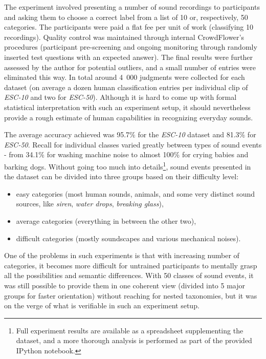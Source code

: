 \documentclass[letterpaper]{sig-alternate}
\begin{document}
The experiment involved presenting a number of sound recordings to participants and asking them to choose a correct label from a list of 10 or, respectively, 50 categories. The participants were paid a flat fee per unit of work (classifying 10 recordings). Quality control was maintained through internal CrowdFlower's procedures (participant pre-screening and ongoing monitoring through randomly inserted test questions with an expected answer). The final results were further assessed by the author for potential outliers, and a small number of entries were eliminated this way. In total around 4~000 judgments were collected for each dataset (on average a dozen human classification entries per individual clip of \textit{ESC-10} and two for \textit{ESC-50}). Although it is hard to come up with formal statistical interpretation with such an experiment setup, it should nevertheless provide a rough estimate of human capabilities in recognizing everyday sounds.

The average accuracy achieved was 95.7\% for the \textit{ESC-10} dataset and 81.3\% for \textit{ESC-50}. Recall for individual classes varied greatly between types of sound events - from 34.1\% for washing machine noise to almost 100\% for crying babies and barking dogs. Without going too much into details\footnote{Full experiment results are available as a spreadsheet supplementing the dataset, and a more thorough analysis is performed as part of the provided IPython notebook.}, sound events presented in the dataset can be divided into three groups based on their difficulty level:

\begin{itemize}[noitemsep,topsep=0pt]
\itemsep0em
\item easy categories (most human sounds, animals, and some very distinct sound sources, like \textit{siren}, \textit{water drops}, \textit{breaking glass}),
\item average categories (everything in between the other two),
\item difficult categories (mostly soundscapes and various mechanical noises).
\end{itemize}

One of the problems in such experiments is that with increasing number of categories, it becomes more difficult for untrained participants to mentally grasp all the possibilities and semantic differences. With 50 classes of sound events, it was still possible to provide them in one coherent view (divided into 5 major groups for faster orientation) without reaching for nested taxonomies, but it was on the verge of what is verifiable in such an experiment setup.
\end{document}
